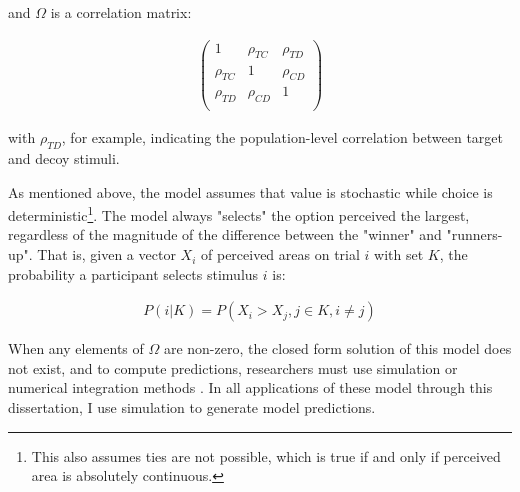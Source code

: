 and $\Omega$ is a correlation matrix:

\begin{align}
   \begin{pmatrix}
      1 & \rho_{TC} & \rho_{TD} \\
      \rho_{TC} & 1 & \rho_{CD} \\
      \rho_{TD} & \rho_{CD} & 1 \\
   \end{pmatrix}
   \label{eqn:O}
\end{align}

with $\rho_{TD}$, for example, indicating the population-level correlation between target and decoy stimuli.

As mentioned above, the model assumes that value is stochastic while choice is deterministic\footnote{This also assumes ties are not possible, which is true if and only if perceived area is absolutely continuous.}. The model always "selects" the option perceived the largest, regardless of the magnitude of the difference between the "winner" and "runners-up". That is, given a vector $X_{i}$ of perceived areas on trial $i$ with set $K$, the probability a participant selects stimulus $i$ is:

\begin{align}
   P(i|K)=P(X_{i}>X_{j}, j \in K, i \neq j)
   \label{eqn:pchoice}
\end{align}

When any elements of $\Omega$ are non-zero, the closed form solution of this model does not exist, and to compute predictions, researchers must use simulation or numerical integration methods \parencite{train2009discrete}. In all applications of these model through this dissertation, I use simulation to generate model predictions.

